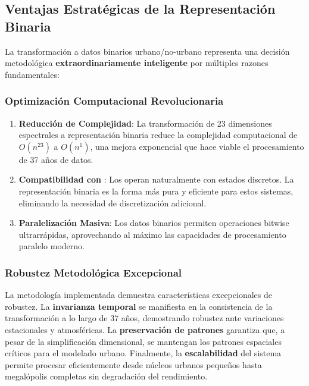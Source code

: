 \subsection{Ventajas Estratégicas de la Representación Binaria}

La transformación a datos binarios urbano/no-urbano representa una decisión metodológica \textbf{extraordinariamente inteligente} por múltiples razones fundamentales:

\subsubsection{Optimización Computacional Revolucionaria}

\begin{enumerate}
	\item \textbf{Reducción de Complejidad}: La transformación de 23 dimensiones espectrales a representación binaria reduce la complejidad computacional de $O(n^{23})$ a $O(n^1)$, una mejora exponencial que hace viable el procesamiento de 37 años de datos.

	\item \textbf{Compatibilidad con \AC{}}: Los \AC{} operan naturalmente con estados discretos. La representación binaria es la forma más pura y eficiente para estos sistemas, eliminando la necesidad de discretización adicional.

	\item \textbf{Paralelización Masiva}: Los datos binarios permiten operaciones bitwise ultrarrápidas, aprovechando al máximo las capacidades de procesamiento paralelo moderno.
\end{enumerate}

\subsubsection{Robustez Metodológica Excepcional}

La metodología implementada demuestra características excepcionales de robustez. La \textbf{invarianza temporal} se manifiesta en la consistencia de la transformación a lo largo de 37 años, demostrando robustez ante variaciones estacionales y atmosféricas. La \textbf{preservación de patrones} garantiza que, a pesar de la simplificación dimensional, se mantengan los patrones espaciales críticos para el modelado urbano. Finalmente, la \textbf{escalabilidad} del sistema permite procesar eficientemente desde núcleos urbanos pequeños hasta megalópolis completas sin degradación del rendimiento.

